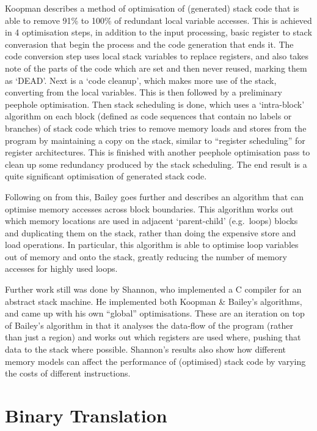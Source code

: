 Koopman describes a method of optimisation of (generated) stack code that is
able to remove 91\% to 100\% of redundant local variable accesses. This is
achieved in 4 optimisation steps, in addition to the input processing, basic
register to stack converasion that begin the process and the code generation
that ends it. The code conversion step uses local stack variables to replace
registers, and also takes note of the parts of the code which are set and then
never reused, marking them as `DEAD'.  Next is a `code cleanup', which makes
more use of the stack, converting from the local variables. This is then
followed by a preliminary peephole optimisation. Then stack scheduling is done,
which uses a `intra-block' algorithm on each block (defined as code sequences
that contain no labels or branches) of stack code which tries to remove memory
loads and stores from the program by maintaining a copy on the stack, similar to
``register scheduling'' for register architectures. This is finished with
another peephole optimisation pass to clean up some redundancy produced by the
stack scheduling. The end result is a quite significant optimisation of
generated stack code.\cite{Koopman1995Preliminary}

Following on from this, Bailey goes further and describes an algorithm that can
optimise memory accesses across block boundaries. This algorithm works out which
memory locations are used in adjacent `parent-child' (e.g.\ loops) blocks and
duplicating them on the stack, rather than doing the expensive store and load
operations. In particular, this algorithm is able to optimise loop variables out
of memory and onto the stack, greatly reducing the number of memory accesses for
highly used loops.\cite{Bailey2000Inter}

Further work still was done by Shannon, who implemented a C compiler for an
abstract stack machine. He implemented both Koopman \& Bailey's algorithms, and
came up with his own ``global'' optimisations. These are an iteration on top of
Bailey's algorithm in that it analyses the data-flow of the program (rather than
just a region) and works out which registers are used where, pushing that data
to the stack where possible. Shannon's results also show how different memory
models can affect the performance of (optimised) stack code by varying the costs
of different instructions.\cite{Shannon2006AC}

\section{Binary Translation}

